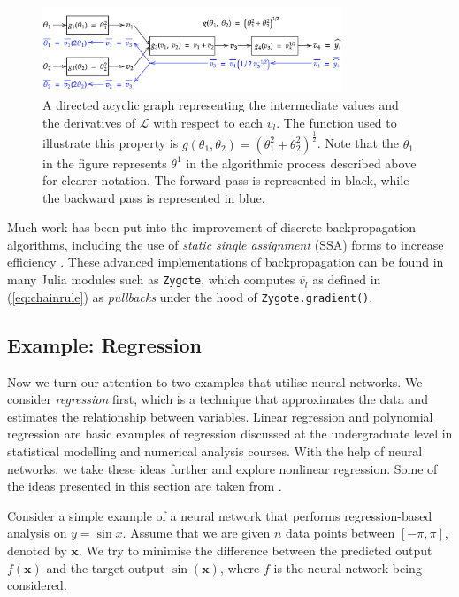 \documentclass[a4paper,11pt,titlepage]{article}
\theoremstyle{definition}
\theoremstyle{plain}
\theoremstyle{remark}
\begin{document}
\begin{figure}[htbp]\label{discretebackprop}
    \centering
    \includegraphics[width=0.8\textwidth]{report/figures/backpropdiscrete.png}
    \caption{A directed acyclic graph representing the intermediate values and the derivatives of $\mathcal{L}$ with respect to each $v_l$. The function used to illustrate this property is $g(\theta_1, \theta_2) = (\theta_1^2 + \theta_2^2)^\frac{1}{2}$. Note that the $\theta_1$ in the figure represents $\theta^1$ in the algorithmic process described above for clearer notation. The forward pass is represented in black, while the backward pass is represented in blue.}
    \label{fig:discretebackprop}
\end{figure}

Much work has been put into the improvement of discrete backpropagation algorithms, including the use of \textit{static single assignment} (SSA) forms to increase efficiency \cite{innes2019}. These advanced implementations of backpropagation can be found in many Julia modules such as \texttt{Zygote}, which computes $\overline{v_l}$ as defined in (\ref{eq:chainrule}) as \textit{pullbacks} under the hood of \texttt{Zygote.gradient()}.

\subsection{Example: Regression}
\label{sec:regex}

Now we turn our attention to two examples that utilise neural networks. We consider \textit{regression} first, which is a technique that approximates the data and estimates the relationship between variables. Linear regression and polynomial regression are basic examples of regression discussed at the undergraduate level in statistical modelling and numerical analysis courses. With the help of neural networks, we take these ideas further and explore nonlinear regression. Some of the ideas presented in this section are taken from \cite{SciMLSANUM2024}.

Consider a simple example of a neural network that performs regression-based analysis on $y = \sin x$. Assume that we are given $n$ data points between $[-\pi, \pi]$, denoted by $\mathbf{x}$. We try to minimise the difference between the predicted output $f(\mathbf{x})$ and the target output $\sin (\mathbf{x})$, where $f$ is the neural network being considered.
\end{document}
